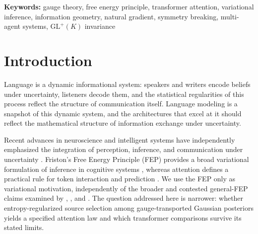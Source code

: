 \documentclass[twoside,11pt]{article}
\begin{document}
\begin{abstract}
The contribution is the specific combination of transported Gaussian posteriors, token-local frames, and a $\mathrm{GL}(K)$ entropy-regularized variational construction, together with an ambient full-Gaussian invariance theorem and an iterative diagonal-covariance realization. The empirical evidence retained in the current package is a fixed-$\mathrm{GL}^+(10)$ WikiText-103 width sweep: across three seeds at each of twelve widths, test perplexity decreases from $219.0 \pm 1.3$ at $K=10$ to $74.1 \pm 0.3$ at $K=120$. The 36 runs span ten source commits, so this is a heterogeneous within-sweep development trend rather than a frozen-commit benchmark or a transferable scaling law. It does not establish exact full-$\mathrm{GL}(K)$ equivariance of the realized diagonal-covariance model.
\end{abstract}

\noindent\textbf{Keywords:} gauge theory, free energy principle, transformer attention, variational inference, information geometry, natural gradient, symmetry breaking, multi-agent systems, $\mathrm{GL}^+(K)$ invariance

\section{Introduction}

Language is a dynamic informational system: speakers and writers encode beliefs under uncertainty, listeners decode them, and the statistical regularities of this process reflect the structure of communication itself. Language modeling is a snapshot of this dynamic system, and the architectures that excel at it should reflect the mathematical structure of information exchange under uncertainty.

Recent advances in neuroscience and intelligent systems have independently emphasized the integration of perception, inference, and communication under uncertainty \citep{bahdanau2014neural,amari1998natural,bronstein2021geometric}. Friston's Free Energy Principle (FEP) provides a broad variational formulation of inference in cognitive systems \citep{Friston2010,parr2022active,friston2017graphical,ramstead2020variational}, whereas attention defines a practical rule for token interaction and prediction \citep{clark2019does,vaswani2017attention}. We use the FEP only as variational motivation, independently of the broader and contested general-FEP claims examined by \citet{bruineberg2022emperor}, \citet{aguilera2022particular}, and \citet{biehl2021technical}. The question addressed here is narrower: whether entropy-regularized source selection among gauge-transported Gaussian posteriors yields a specified attention law and which transformer comparisons survive its stated limits.
\end{document}
